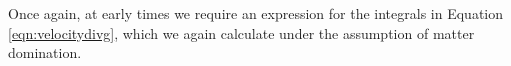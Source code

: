 \documentclass[twocolumn,superscriptaddress,prd]{revtex4}
\newcommand\numberthis{\addtocounter{equation}{1}\tag{\theequation}}
\begin{document}
Once again, at early times we require an expression for the integrals
in Equation \eqref{eqn:velocitydivg}, which we again calculate under the
assumption of matter domination.




\end{document}
